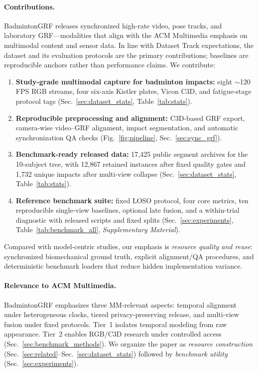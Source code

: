 \documentclass[sigconf,screen]{acmart}
\newcommand{\BadmintonGRFSupplementary}{\emph{Supplementary Material}}
\newcommand{\QAabbrev}{QA}
\begin{document}
\paragraph{Contributions.}
BadmintonGRF releases synchronized high-rate video, pose tracks, and laboratory GRF—modalities that align with the ACM Multimedia emphasis on multimodal content and sensor data. In line with Dataset Track expectations, the dataset and its evaluation protocols are the primary contributions; baselines are reproducible anchors rather than performance claims.
We contribute:
\begin{enumerate}
  \item \textbf{Study-grade multimodal capture for badminton impacts:} eight \(\sim\)120\,FPS RGB streams, four six-axis Kistler plates, Vicon C3D, and fatigue-stage protocol tags (Sec.~\ref{sec:dataset_stats}, Table~\ref{tab:stats}).
  \item \textbf{Reproducible preprocessing and alignment:} C3D-based GRF export, camera-wise video--GRF alignment, impact segmentation, and automatic synchronization \QAabbrev{} checks (Fig.~\ref{fig:pipeline}, Sec.~\ref{sec:sync_grf}).
  \item \textbf{Benchmark-ready released data:} 17{,}425 public segment archives for the 10-subject tree, with 12{,}867 retained instances after fixed quality gates and 1{,}732 unique impacts after multi-view collapse (Sec.~\ref{sec:dataset_stats}, Table~\ref{tab:stats}).
  \item \textbf{Reference benchmark suite:} fixed LOSO protocol, four core metrics, ten reproducible single-view baselines, optional late fusion, and a within-trial diagnostic with released scripts and fixed splits (Sec.~\ref{sec:experiments}, Table~\ref{tab:benchmark_all}, \BadmintonGRFSupplementary).
\end{enumerate}
Compared with model-centric studies, our emphasis is \emph{resource quality and reuse}: synchronized biomechanical ground truth, explicit alignment/\QAabbrev{} procedures, and deterministic benchmark loaders that reduce hidden implementation variance.

\paragraph{Relevance to ACM Multimedia.}
BadmintonGRF emphasizes three MM-relevant aspects: temporal alignment under heterogeneous clocks, tiered privacy-preserving release, and multi-view fusion under fixed protocols.
Tier~1 isolates temporal modeling from raw appearance.
Tier~2 enables RGB/C3D research under controlled access (Sec.~\ref{sec:benchmark_methods}).
We organize the paper as \emph{resource construction} (Sec.~\ref{sec:related}--Sec.~\ref{sec:dataset_stats}) followed by \emph{benchmark utility} (Sec.~\ref{sec:experiments}).
\end{document}

